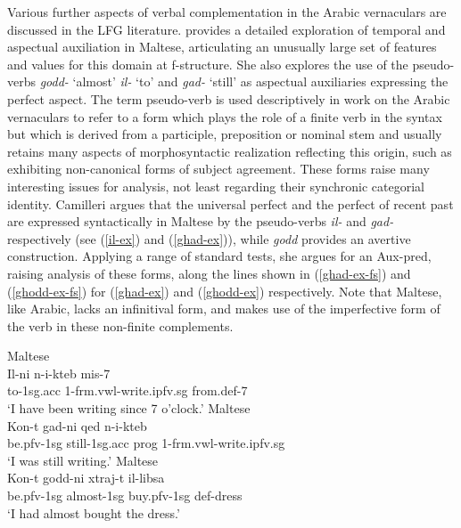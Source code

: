 \documentclass[output=paper,hidelinks]{langscibook}
\begin{document}
Various  further aspects of verbal complementation in the Arabic vernaculars are discussed in the LFG literature. \citet{Camilleri:PhD16} provides a detailed exploration of temporal and aspectual auxiliation in Maltese, articulating an unusually large set of features and values for this domain at f-structure. She also explores the use of the pseudo-verbs {\em g{\hwithstroke}odd-} `almost' {\em il-} `to' and {\em g{\hwithstroke}ad-} `still'  as aspectual  auxiliaries expressing the {\sc perfect} aspect.  The term pseudo-verb is used descriptively in work on the Arabic vernaculars to refer to a form which plays the role of a finite verb  in the syntax but which is derived from
a participle, preposition or nominal stem and usually retains many aspects of morphosyntactic realization reflecting this origin, such as exhibiting non-canonical forms of subject agreement.  These forms raise many interesting issues for analysis, not least regarding their synchronic categorial identity.   Camilleri  argues that the universal perfect and the perfect of recent past are expressed syntactically in Maltese by the pseudo-verbs {\em il-} and {\em g{\hwithstroke}ad-} respectively (see (\ref{il-ex}) and (\ref{ghad-ex})), while {\em g{\hwithstroke}odd} provides an avertive construction. Applying a range of standard tests, she argues  for an Aux-{\sc pred}, raising analysis of these forms, along the lines shown in (\ref{ghad-ex-fs}) and (\ref{ghodd-ex-fs}) for (\ref{ghad-ex}) and (\ref{ghodd-ex}) respectively. Note that Maltese, like Arabic, lacks an infinitival form, and makes use of the imperfective form of the verb in these non-finite complements.




\ea   \label{il-ex} Maltese \citep[205]{Camilleri:PhD16} \\
\gll Il-ni   n-i-kteb mis-7\\
to-{\sc 1sg.acc}  1-{\sc frm.vwl}-write.{\sc ipfv.sg} from.{\sc def}-7\\
\glt `I have been writing since 7 o'clock.'
\ex  \label{ghad-ex} Maltese \citep[213]{Camilleri:PhD16}\\
\gll Kon-t g{\hwithstroke}ad-ni qed n-i-kteb\\
be.{\sc pfv-1sg} still-{\sc 1sg.acc} {\sc prog} 1-{\sc frm.vwl}-write.{\sc ipfv.sg}\\
\glt `I was still writing.'
\ex
\label{ghodd-ex} Maltese \citep[213]{Camilleri:PhD16} \\
\gll Kon-t g{\hwithstroke}odd-ni xtraj-t il-libsa\\
be.{\sc pfv-1sg} almost-{\sc 1sg} buy.{\sc pfv-1sg} {\sc def}-dress\\
\glt `I had almost bought the dress.'
\z
\end{document}
